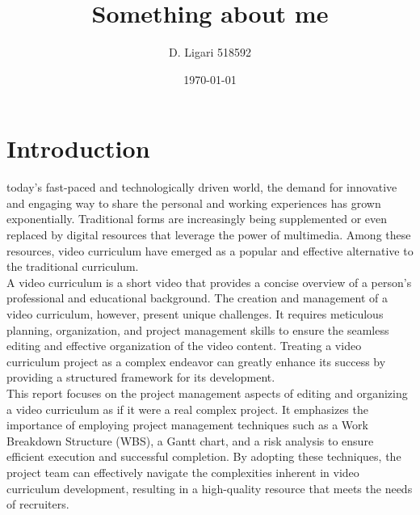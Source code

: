 \documentclass[eng]{class}
\title{Something about me}
\author{D. Ligari 518592}
\affil{Digital content retrieval, University of Pavia, Department of Computer Engineering (Data Science), Pavia, Italy}
\date{\today}
\begin{document}
\maketitle
\tableofcontents
\thispagestyle{FirstPage}
\section{Introduction}
today's fast-paced and technologically driven world, the demand for innovative and engaging way to share the personal and working experiences has grown exponentially.
Traditional forms are increasingly being supplemented or even replaced by digital resources that leverage the power of multimedia.
Among these resources, video curriculum have emerged as a popular and effective alternative to the traditional curriculum.\\
A video curriculum is a short video that provides a concise overview of a person's professional and educational background.
The creation and management of a video curriculum, however, present unique challenges.
It requires meticulous planning, organization, and project management skills to ensure the seamless editing and effective organization of the video content.
Treating a video curriculum project as a complex endeavor can greatly enhance its success by providing a structured framework for its development.\\
This report focuses on the project management aspects of editing and organizing a video curriculum as if it were a real complex project.
It emphasizes the importance of employing project management techniques such as a Work Breakdown Structure (WBS), a Gantt chart,
and a risk analysis to ensure efficient execution and successful completion. By adopting these techniques,
the project team can effectively navigate the complexities inherent in video curriculum development,
resulting in a high-quality resource that meets the needs of recruiters.
\end{document}
